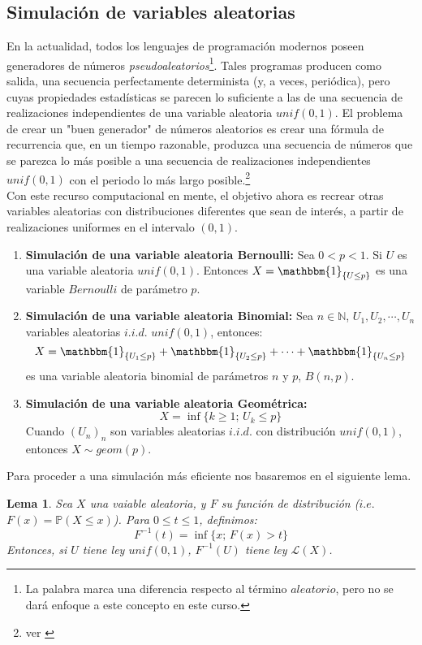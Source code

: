 \documentclass[a4paper]{article}
\newtheorem{lem}{Lema}
\numberwithin{equation}{subsection}
\def\N{\mathbb N}
\newcommand{\pb}{\mathbb{P}}
\begin{document}
\subsection{Simulación de variables aleatorias}
En la actualidad, todos los lenguajes de programación modernos poseen generadores de números \textit{pseudoaleatorios}\footnote{La palabra marca una diferencia respecto al término $aleatorio$, pero no se dará enfoque a este concepto en este curso.}. Tales programas producen como salida, una secuencia perfectamente determinista (y, a veces, periódica), pero cuyas propiedades estadísticas se parecen lo suficiente a las de una secuencia de realizaciones independientes de una variable aleatoria $unif(0,1)$. El problema de crear un "buen generador" de números aleatorios es crear una fórmula de recurrencia que, en un tiempo razonable, produzca una secuencia de números que se parezca lo más posible a una secuencia de realizaciones independientes $unif(0,1)$ con el periodo lo más largo posible.\footnote{ver  \cite[cap. 1]{Pard}}\\ Con este recurso computacional en mente, el objetivo ahora es recrear otras variables aleatorias con distribuciones diferentes que sean de interés, a partir de realizaciones uniformes en el intervalo $(0,1)$.\\ \newline
\begin{enumerate}
    \item \textbf{Simulación de una variable aleatoria Bernoulli:} Sea $0<p<1$. Si $U$ es una variable aleatoria $unif(0,1)$. Entonces $X=\mathbbm{1}_{\{U \leq p\}}$ es una variable $Bernoulli$ de parámetro $p$.
    \item \textbf{Simulación de una variable aleatoria Binomial:} Sea $n\in\N$, $U_1,U_2,\cdots,U_n$ variables aleatorias $i.i.d.$ $unif(0,1)$, entonces:
    \[X=\mathbbm{1}_{\{U_1\leq p\}} + \mathbbm{1}_{\{U_2\leq p\}}+\cdots + \mathbbm{1}_{\{U_n \leq p\}}\]
    es una variable aleatoria binomial de parámetros $n$ y $p$, $B(n,p)$.
    \item \textbf{Simulación de una variable aleatoria Geométrica:}
    \[X = \inf\{k\geq 1;\,U_k\leq p\}\]
    Cuando $(U_n)_n$ son variables aleatorias $i.i.d.$ con distribución $unif(0,1)$, \\entonces $X\sim geom(p)$.
\end{enumerate}
Para proceder a una simulación más eficiente nos basaremos en el siguiente lema.

\begin{lem} Sea $X$ una vaiable aleatoria, y $F$ su función de distribución ($i.e.$ $F(x) = \pb(X\leq x)$). Para $0\leq t\leq 1$, definimos:
\[F^{-1}(t) = \inf\{x;\,F(x)>t\}\]
Entonces, si $U$ tiene ley $unif(0,1)$, $F^{-1}(U)$ tiene ley $\mathcal{L}(X)$.
\end{lem}
\end{document}
